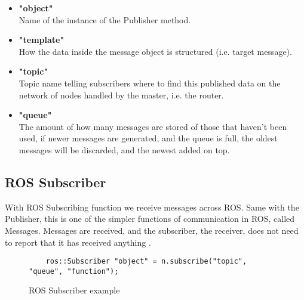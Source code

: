 \begin{itemize}
\setlength{\itemsep}{0.05\baselineskip}

    \item \textbf{"object"}     \\Name of the instance of the Publisher method.
    
    \item \textbf{"template"}   \\How the data inside the message object is structured (i.e. target message).
    
    \item \textbf{"topic"}      \\Topic name telling subscribers where to find this published data on the network of nodes handled by the master, i.e. the router.
    
    \item \textbf{"queue"}      \\The amount of how many messages are stored of those that haven't been used, if newer messages are generated, and the queue is full, the oldest messages will be discarded, and the newest added on top.
\end{itemize}

\subsection{ROS Subscriber}

With ROS Subscribing function we receive messages across ROS. Same with the Publisher, this is one of the simpler functions of communication in ROS, called Messages. Messages are received, and the subscriber, the receiver, does not need to report that it has received anything \cite{ROSPubSub}. %

\begin{figure}[!ht]
\begin{lstlisting}
    ros::Subscriber "object" = n.subscribe("topic", "queue", "function");
\end{lstlisting}
\vspace{-10mm}
\caption{ROS Subscriber example}
\end{figure}

